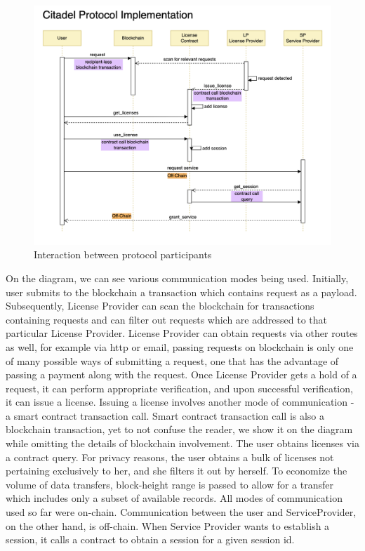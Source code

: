 \begin{figure}[h]
	\centering
		\includegraphics[width=390pt,draft=false]{images/implementation.png}
	\caption{Interaction between protocol participants}
	\label{fig:implementation}
\end{figure}

\begin{flushleft}
On the diagram, we can see various communication modes being used. Initially, user submits to the blockchain a transaction which contains request as a payload. Subsequently, License Provider can scan the blockchain for transactions containing requests and can filter out requests which are addressed to that particular License Provider. License Provider can obtain requests via other routes as well, for example via http or email, passing requests on blockchain is only one of many possible ways of submitting a request, one that has the advantage of passing a payment along with the request. Once License Provider gets a hold of a request, it can perform appropriate verification, and upon successful verification, it can issue a license. Issuing a license involves another mode of communication - a smart contract transaction call. Smart contract transaction call is also a blockchain transaction, yet to not confuse the reader, we show it on the diagram while omitting the details of blockchain involvement. The user obtains licenses via a contract query. For privacy reasons, the user obtains a bulk of licenses not pertaining exclusively to her, and she filters it out by herself. To economize the volume of data transfers, block-height range is passed to allow for a transfer which includes only a subset of available records. All modes of communication used so far were on-chain. Communication between the user and ServiceProvider, on the other hand, is off-chain. When Service Provider wants to establish a session, it calls a contract to obtain a session for a given session id.
\end{flushleft}


